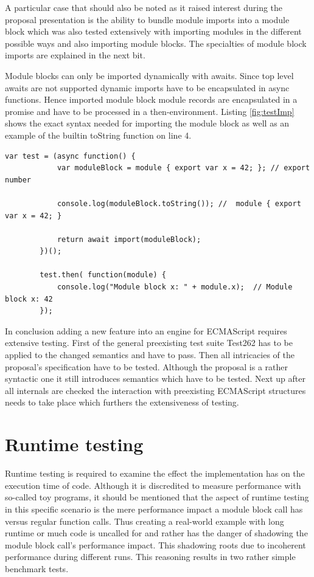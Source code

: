 A particular case that should also be noted as it raised interest during the proposal presentation is the ability to bundle module imports into a module block which was also tested extensively with importing modules in the different possible ways and also importing module blocks. The specialties of module block imports are explained in the next bit.

Module blocks can only be imported dynamically with awaits. Since top level awaits are not supported dynamic imports have to be encapsulated in async functions. Hence imported module block module records are encapsulated in a promise and have to be processed in a then-environment. Listing \ref{fig:testImp} shows the exact syntax needed for importing the module block as well as an example of the builtin toString function on line 4.

    \begin{lstlisting}[caption={Module block dynamic import test}, label={fig:testImp}]
        var test = (async function() {
            var moduleBlock = module { export var x = 42; }; // export number
            
            console.log(moduleBlock.toString()); //  module { export var x = 42; }
            
            return await import(moduleBlock);
        })();
        
        test.then( function(module) {
            console.log("Module block x: " + module.x);  // Module block x: 42
        });
    \end{lstlisting}

In conclusion adding a new feature into an engine for ECMAScript requires extensive testing. First of the general preexisting test suite Test262 has to be applied to the changed semantics and have to pass. Then all intricacies of the proposal's specification have to be tested. Although the proposal is a rather syntactic one it still introduces semantics which have to be tested. Next up after all internals are checked the interaction with preexisting ECMAScript structures needs to take place which furthers the extensiveness of testing.

\section{Runtime testing}

Runtime testing is required to examine the effect the implementation has on the execution time of code.  Although it is discredited to measure performance with so-called toy programs, it should be mentioned that the aspect of runtime testing in this specific scenario is the mere performance impact a module block call has versus regular function calls. \cite{HennessyJohnL2007Ca:a} Thus creating a real-world example with long runtime or much code is uncalled for and rather has the danger of shadowing the module block call's performance impact. This shadowing roots 
due to incoherent performance during different runs. This reasoning results in two rather simple benchmark tests.

